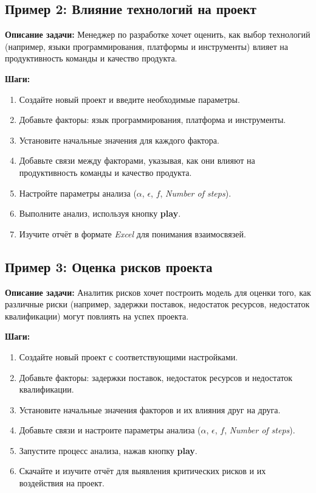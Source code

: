 \documentclass{article}
\begin{document}
    \subsection{Пример 2: Влияние технологий на проект}

    \textbf{Описание задачи:} Менеджер по разработке хочет оценить, как выбор технологий (например, языки программирования, платформы и инструменты) влияет на продуктивность команды и качество продукта.

    \textbf{Шаги:}
    \begin{enumerate}
        \item Создайте новый проект и введите необходимые параметры.
        \item Добавьте факторы: язык программирования, платформа и инструменты.
        \item Установите начальные значения для каждого фактора.
        \item Добавьте связи между факторами, указывая, как они влияют на продуктивность команды и качество продукта.
        \item Настройте параметры анализа ($\alpha$, $\epsilon$, $f$, \textit{Number of steps}).
        \item Выполните анализ, используя кнопку \textbf{play}.
        \item Изучите отчёт в формате \textit{Excel} для понимания взаимосвязей.
    \end{enumerate}

    \subsection{Пример 3: Оценка рисков проекта}

    \textbf{Описание задачи:} Аналитик рисков хочет построить модель для оценки того, как различные риски (например, задержки поставок, недостаток ресурсов, недостаток квалификации) могут повлиять на успех проекта.

    \textbf{Шаги:}
    \begin{enumerate}
        \item Создайте новый проект с соответствующими настройками.
        \item Добавьте факторы: задержки поставок, недостаток ресурсов и недостаток квалификации.
        \item Установите начальные значения факторов и их влияния друг на друга.
        \item Добавьте связи и настроите параметры анализа ($\alpha$, $\epsilon$, $f$, \textit{Number of steps}).
        \item Запустите процесс анализа, нажав кнопку \textbf{play}.
        \item Скачайте и изучите отчёт для выявления критических рисков и их воздействия на проект.
    \end{enumerate}
\end{document}
